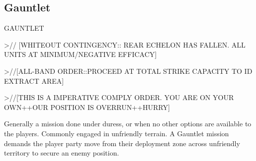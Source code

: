 \subsection{Gauntlet}


                                                             GAUNTLET

                                                             >// [WHITEOUT CONTINGENCY:: REAR
                                                             ECHELON HAS FALLEN. ALL UNITS AT
                                                             MINIMUM/NEGATIVE EFFICACY]

                                                             >//[ALL-BAND ORDER::PROCEED AT TOTAL
                                                             STRIKE CAPACITY TO ID EXTRACT AREA]

                                                             >//[THIS IS A IMPERATIVE COMPLY ORDER.
                                                             YOU ARE ON YOUR OWN++OUR POSITION
                                                             IS OVERRUN++HURRY]

                                                             Generally a mission done under duress, or
                                                            when no other options are available to the
                                                             players. Commonly engaged in unfriendly
                                                            terrain. A Gauntlet mission demands the
                                                             player party move from their deployment zone
                                                             across unfriendly territory to secure an enemy
                                                             position.

